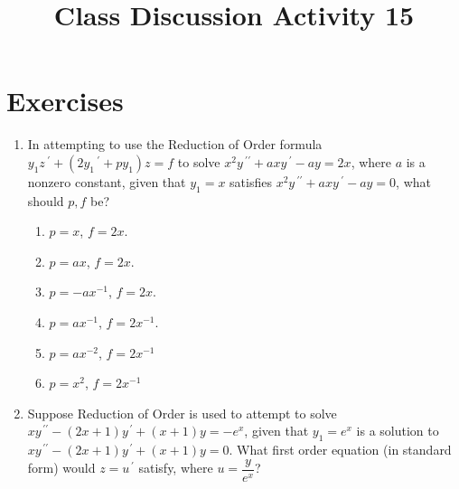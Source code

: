 \documentclass{ximera}
\begin{document}
\begin{abstract}
 \end{abstract}

    \title{Class Discussion Activity 15}
    
    \maketitle

\section*{Exercises}

\begin{enumerate}[label=(\arabic*)]

\item In attempting to use the Reduction of Order formula\\ $y_1 z\,^{\prime}  +(2y_1\,^{\prime}+py_1)z=f$ to solve $x^2 y\,^{\prime\prime} +axy\,^{\prime}-ay=2x$, where $a$ is a nonzero constant, given that $y_1=x$ satisfies $x^2 y\,^{\prime\prime} +a xy\,^{\prime}-ay=0$, what should $p,f$ be?



\begin{enumerate}[label=(\alph*)]
\item $p=x$, $f=2x$.
\item $p=ax$, $f=2x$.
\item $p=-ax^{-1}$, $f=2x$.
\item $p=ax^{-1}$, $f=2x^{-1}$.  
\item $p=ax^{-2}$, $f=2x^{-1}$
\item $p=x^2$, $f=2x^{-1}$
\end{enumerate}

 


\item Suppose Reduction of Order is used to attempt to solve \\ $xy^{\,\prime\prime}-(2x+1)y^{\,\prime}+(x+1)y=-e^x$, given that $y_1=e^x$ is a solution to \\$xy^{\,\prime\prime}-(2x+1)y^{\,\prime}+(x+1)y=0$.  What first order equation (in standard form) would $z=u^{\,\prime}$ satisfy, where $u=\dfrac{y}{e^x}$?\\
    
    
    

\end{enumerate}
\end{document}
